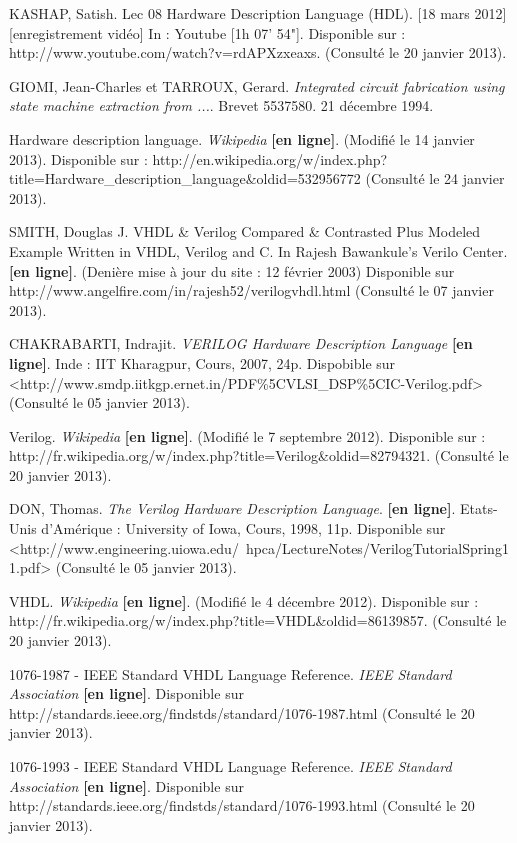 KASHAP, Satish. Lec 08 Hardware Description Language (HDL). [18 mars 2012] [enregistrement vidéo] In : Youtube [1h 07' 54"]. Disponible sur : http://www.youtube.com/watch?v=rdAPXzxeaxs. (Consulté le 20 janvier 2013).

GIOMI, Jean-Charles et TARROUX, Gerard. \textit{Integrated circuit fabrication using state machine extraction from ...}. Brevet 5537580. 21 décembre 1994.

Hardware description language. \textit{Wikipedia} \textbf{[en ligne]}. (Modifié le 14 janvier 2013). Disponible sur : http://en.wikipedia.org/w/index.php?title=Hardware\_description\_language\&oldid=532956772 (Consulté le 24 janvier 2013).

SMITH, Douglas J. VHDL \& Verilog Compared \& Contrasted Plus Modeled Example Written in VHDL, Verilog and C. In Rajesh Bawankule's Verilo Center. \textbf{[en ligne]}. (Denière mise à jour du site : 12 février 2003) Disponible sur http://www.angelfire.com/in/rajesh52/verilogvhdl.html (Consulté le 07 janvier 2013).

CHAKRABARTI, Indrajit. \textit{VERILOG Hardware Description Language} \textbf{[en ligne]}. Inde : IIT Kharagpur, Cours, 2007, 24p. Dispobible sur <http://www.smdp.iitkgp.ernet.in/PDF\%5CVLSI_DSP\%5CIC-Verilog.pdf> (Consulté le 05 janvier 2013).

Verilog. \textit{Wikipedia} \textbf{[en ligne]}. (Modifié le 7 septembre 2012). Disponible sur : http://fr.wikipedia.org/w/index.php?title=Verilog\&oldid=82794321. (Consulté le 20 janvier 2013).

DON, Thomas. \textit{The Verilog Hardware Description Language}. \textbf{[en ligne]}. Etats-Unis d'Amérique : University of Iowa, Cours, 1998, 11p. Disponible sur <http://www.engineering.uiowa.edu/~hpca/LectureNotes/VerilogTutorialSpring11.pdf> (Consulté le 05 janvier 2013).

VHDL. \textit{Wikipedia} \textbf{[en ligne]}. (Modifié le 4 décembre 2012). Disponible sur : http://fr.wikipedia.org/w/index.php?title=VHDL\&oldid=86139857. (Consulté le 20 janvier 2013).

1076-1987 - IEEE Standard VHDL Language Reference. \textit{IEEE Standard Association} \textbf{[en ligne]}. Disponible sur http://standards.ieee.org/findstds/standard/1076-1987.html (Consulté le 20 janvier 2013).

1076-1993 - IEEE Standard VHDL Language Reference. \textit{IEEE Standard Association} \textbf{[en ligne]}. Disponible sur http://standards.ieee.org/findstds/standard/1076-1993.html (Consulté le 20 janvier 2013).

